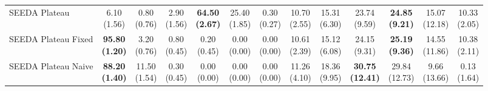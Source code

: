 \begin{table}[H]
{\begin{tabular}{l|cccccc|cccccc}
SEEDA Plateau & \makecell{6.10 \\ (1.56)} & \makecell{0.80 \\ (0.76)} & {\cellcolor[HTML]{C8E6C9}} \makecell{2.90 \\ (1.56)} & \bfseries \makecell{64.50 \\ (2.67)} & \makecell{25.40 \\ (1.85)} & \makecell{0.30 \\ (0.27)} & \makecell{10.70 \\ (2.55)} & \makecell{15.31 \\ (6.30)} & {\cellcolor[HTML]{C8E6C9}} \makecell{23.74 \\ (9.59)} & \bfseries \makecell{24.85 \\ (9.21)} & \makecell{15.07 \\ (12.18)} & \makecell{10.33 \\ (2.05)} \\
SEEDA Plateau Fixed & \bfseries \makecell{95.80 \\ (1.20)} & \makecell{3.20 \\ (0.76)} & {\cellcolor[HTML]{C8E6C9}} \makecell{0.80 \\ (0.45)} & \makecell{0.20 \\ (0.45)} & \makecell{0.00 \\ (0.00)} & \makecell{0.00 \\ (0.00)} & \makecell{10.61 \\ (2.39)} & \makecell{15.12 \\ (6.08)} & {\cellcolor[HTML]{C8E6C9}} \makecell{24.15 \\ (9.31)} & \bfseries \makecell{25.19 \\ (9.36)} & \makecell{14.55 \\ (11.86)} & \makecell{10.38 \\ (2.11)} \\
SEEDA Plateau Naive & \bfseries \makecell{88.20 \\ (1.40)} & \makecell{11.50 \\ (1.54)} & {\cellcolor[HTML]{C8E6C9}} \makecell{0.30 \\ (0.45)} & \makecell{0.00 \\ (0.00)} & \makecell{0.00 \\ (0.00)} & \makecell{0.00 \\ (0.00)} & \makecell{11.26 \\ (4.10)} & \makecell{18.36 \\ (9.95)} & {\cellcolor[HTML]{C8E6C9}} \bfseries \makecell{30.75 \\ (12.41)} & \makecell{29.84 \\ (12.73)} & \makecell{9.66 \\ (13.66)} & \makecell{0.13 \\ (1.64)} \\
\bottomrule
\end{tabular}
}%
\end{table}
